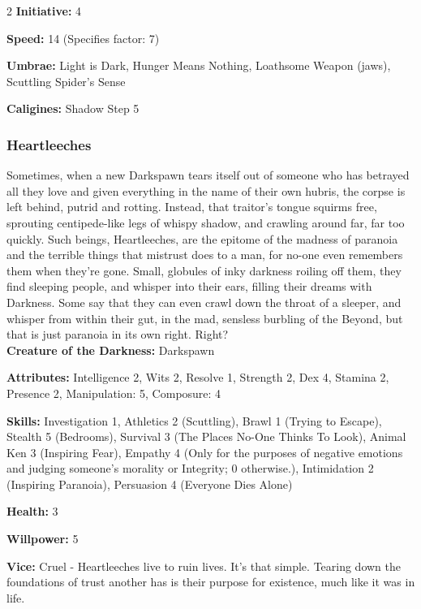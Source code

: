 \begin{multicols}{2}
\noindent \textbf{Initiative:} 4

\noindent \textbf{Speed:} 14 (Specifies factor: 7)

\noindent \textbf{Umbrae:} Light is Dark, Hunger Means Nothing, Loathsome Weapon (jaws), Scuttling Spider’s Sense

\noindent \textbf{Caligines:}  Shadow Step 5

\subsubsection*{Heartleeches}

Sometimes, when a new Darkspawn tears itself out of someone who has betrayed all they love and given everything in the name of their own hubris, the corpse is left behind, putrid and rotting. Instead, that traitor's tongue squirms free, sprouting centipede-like legs of whispy shadow, and crawling around far, far too quickly. Such beings, Heartleeches, are the epitome of the madness of paranoia and the terrible things that mistrust does to a man, for no-one even remembers them when they're gone. Small, globules of inky darkness roiling off them, they find sleeping people, and whisper into their ears, filling their dreams with Darkness. Some say that they can even crawl down the throat of a sleeper, and whisper from within their gut, in the mad, sensless burbling of the Beyond, but that is just paranoia in its own right. Right?\\

\noindent \textbf{Creature of the Darkness:} Darkspawn

\noindent \textbf{Attributes:} Intelligence 2, Wits 2, Resolve 1, Strength 2, Dex 4, Stamina 2, Presence 2, Manipulation: 5, Composure: 4

\noindent \textbf{Skills:} Investigation 1, Athletics 2 (Scuttling), Brawl 1 (Trying to Escape), Stealth 5 (Bedrooms), Survival 3 (The Places No-One Thinks To Look), Animal Ken 3 (Inspiring Fear), Empathy 4 (Only for the purposes of negative emotions and judging someone's morality or Integrity; 0 otherwise.), Intimidation 2 (Inspiring Paranoia), Persuasion 4 (Everyone Dies Alone)

\noindent \textbf{Health:} 3

\noindent \textbf{Willpower:} 5

\noindent \textbf{Vice:} Cruel - Heartleeches live to ruin lives. It's that simple. Tearing down the foundations of trust another has is their purpose for existence, much like it was in life.


\end{multicols}
